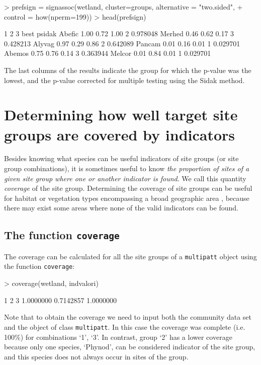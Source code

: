 \documentclass[11pt,a4paper]{article}
\begin{document}
\begin{Schunk}
\begin{Sinput}
> prefsign = signassoc(wetland, cluster=groups,  alternative = "two.sided", 
+                      control = how(nperm=199)) 
> head(prefsign)
\end{Sinput}
\begin{Soutput}
          1    2    3 best   psidak
Abefic 1.00 0.72 1.00    2 0.978048
Merhed 0.46 0.62 0.17    3 0.428213
Alyvag 0.97 0.29 0.86    2 0.642089
Pancam 0.01 0.16 0.01    1 0.029701
Abemos 0.75 0.76 0.14    3 0.363944
Melcor 0.01 0.84 0.01    1 0.029701
\end{Soutput}
\end{Schunk}
The last columns of the results indicate the group for which the p-value was the lowest, and the p-value corrected for multiple testing using the Sidak method.

\section{Determining how well target site groups are covered by indicators}
Besides knowing what species can be useful indicators of site groups (or site group combinations), it is sometimes useful to know \emph{the proportion of sites of a given site group where one or another indicator is found}. We call this quantity \emph{coverage} of the site group. Determining the coverage of site groups can be useful for habitat or vegetation types encompassing a broad geographic area \citep{DeCaceres2012}, because there may exist some areas where none of the valid indicators can be found.  
\subsection{The function \texttt{coverage}}
The coverage can be calculated for all the site groups of a \texttt{multipatt} object using the function \texttt{coverage}:
\begin{Schunk}
\begin{Sinput}
> coverage(wetland, indvalori)
\end{Sinput}
\begin{Soutput}
        1         2         3 
1.0000000 0.7142857 1.0000000 
\end{Soutput}
\end{Schunk}
Note that to obtain the coverage we need to input both the community data set and the object of class \texttt{multipatt}. In this case the coverage was complete (i.e. 100\%) for combinations `1', `3'. In contrast, group `2' has a lower coverage because only one species, `Phynod', can be considered indicator of the site group, and this species does not always occur in sites of the group. 
\end{document}
